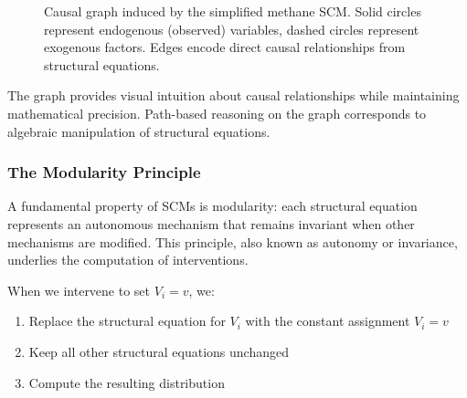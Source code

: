 \begin{figure}[h!]
\centering
{}
\caption{Causal graph induced by the simplified methane SCM. Solid circles represent endogenous (observed) variables, dashed circles represent exogenous factors. Edges encode direct causal relationships from structural equations.}
\label{fig:methane_dag}
\end{figure}

The graph provides visual intuition about causal relationships while maintaining mathematical precision. Path-based reasoning on the graph corresponds to algebraic manipulation of structural equations.

\subsubsection{The Modularity Principle}

A fundamental property of SCMs is modularity: each structural equation represents an autonomous mechanism that remains invariant when other mechanisms are modified. This principle, also known as autonomy or invariance, underlies the computation of interventions.

When we intervene to set $V_i = v$, we:
\begin{enumerate}
\item Replace the structural equation for $V_i$ with the constant assignment $V_i = v$
\item Keep all other structural equations unchanged
\item Compute the resulting distribution
\end{enumerate}

